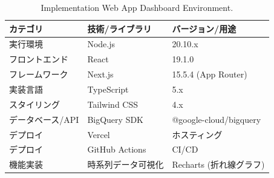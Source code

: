 \begin{table}[htbp]
    \centering
    \caption{Implementation Web App Dashboard Environment.}
    \label{tab:web_dashboard_environment}
    \begin{tabular}{lll}
    \hline
    \textbf{カテゴリ} & \textbf{技術/ライブラリ} & \textbf{バージョン/用途} \\ \hline
    \hline
    実行環境 & Node.js & 20.10.x \\ 
    フロントエンド & React & 19.1.0 \\ 
    フレームワーク & Next.js & 15.5.4 (App Router) \\ 
    実装言語 & TypeScript & 5.x \\
    スタイリング & Tailwind CSS & 4.x \\
    データベース/API & BigQuery SDK & @google-cloud/bigquery \\ 
    デプロイ & Vercel & ホスティング \\ 
    デプロイ & GitHub Actions & CI/CD \\ 
    機能実装 & 時系列データ可視化 & Recharts (折れ線グラフ) \\ 
    \hline
    \end{tabular}
\end{table}
